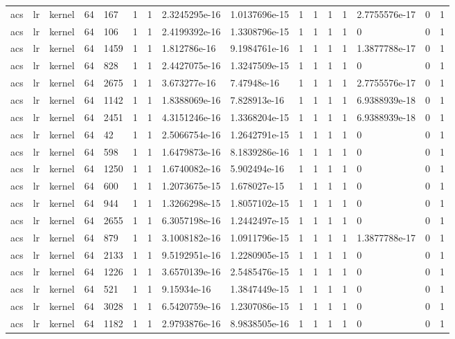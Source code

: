 \begin{tabular}{llllllllllllllll}
acs & lr & kernel & 64 & 167 & 1 & 1 & 2.3245295e-16 & 1.0137696e-15 & 1 & 1 & 1 & 1 & 2.7755576e-17 & 0 & 1 \\
acs & lr & kernel & 64 & 106 & 1 & 1 & 2.4199392e-16 & 1.3308796e-15 & 1 & 1 & 1 & 1 & 0 & 0 & 1 \\
acs & lr & kernel & 64 & 1459 & 1 & 1 & 1.812786e-16 & 9.1984761e-16 & 1 & 1 & 1 & 1 & 1.3877788e-17 & 0 & 1 \\
acs & lr & kernel & 64 & 828 & 1 & 1 & 2.4427075e-16 & 1.3247509e-15 & 1 & 1 & 1 & 1 & 0 & 0 & 1 \\
acs & lr & kernel & 64 & 2675 & 1 & 1 & 3.673277e-16 & 7.47948e-16 & 1 & 1 & 1 & 1 & 2.7755576e-17 & 0 & 1 \\
acs & lr & kernel & 64 & 1142 & 1 & 1 & 1.8388069e-16 & 7.828913e-16 & 1 & 1 & 1 & 1 & 6.9388939e-18 & 0 & 1 \\
acs & lr & kernel & 64 & 2451 & 1 & 1 & 4.3151246e-16 & 1.3368204e-15 & 1 & 1 & 1 & 1 & 6.9388939e-18 & 0 & 1 \\
acs & lr & kernel & 64 & 42 & 1 & 1 & 2.5066754e-16 & 1.2642791e-15 & 1 & 1 & 1 & 1 & 0 & 0 & 1 \\
acs & lr & kernel & 64 & 598 & 1 & 1 & 1.6479873e-16 & 8.1839286e-16 & 1 & 1 & 1 & 1 & 0 & 0 & 1 \\
acs & lr & kernel & 64 & 1250 & 1 & 1 & 1.6740082e-16 & 5.902494e-16 & 1 & 1 & 1 & 1 & 0 & 0 & 1 \\
acs & lr & kernel & 64 & 600 & 1 & 1 & 1.2073675e-15 & 1.678027e-15 & 1 & 1 & 1 & 1 & 0 & 0 & 1 \\
acs & lr & kernel & 64 & 944 & 1 & 1 & 1.3266298e-15 & 1.8057102e-15 & 1 & 1 & 1 & 1 & 0 & 0 & 1 \\
acs & lr & kernel & 64 & 2655 & 1 & 1 & 6.3057198e-16 & 1.2442497e-15 & 1 & 1 & 1 & 1 & 0 & 0 & 1 \\
acs & lr & kernel & 64 & 879 & 1 & 1 & 3.1008182e-16 & 1.0911796e-15 & 1 & 1 & 1 & 1 & 1.3877788e-17 & 0 & 1 \\
acs & lr & kernel & 64 & 2133 & 1 & 1 & 9.5192951e-16 & 1.2280905e-15 & 1 & 1 & 1 & 1 & 0 & 0 & 1 \\
acs & lr & kernel & 64 & 1226 & 1 & 1 & 3.6570139e-16 & 2.5485476e-15 & 1 & 1 & 1 & 1 & 0 & 0 & 1 \\
acs & lr & kernel & 64 & 521 & 1 & 1 & 9.15934e-16 & 1.3847449e-15 & 1 & 1 & 1 & 1 & 0 & 0 & 1 \\
acs & lr & kernel & 64 & 3028 & 1 & 1 & 6.5420759e-16 & 1.2307086e-15 & 1 & 1 & 1 & 1 & 0 & 0 & 1 \\
acs & lr & kernel & 64 & 1182 & 1 & 1 & 2.9793876e-16 & 8.9838505e-16 & 1 & 1 & 1 & 1 & 0 & 0 & 1 \\

\end{tabular}
